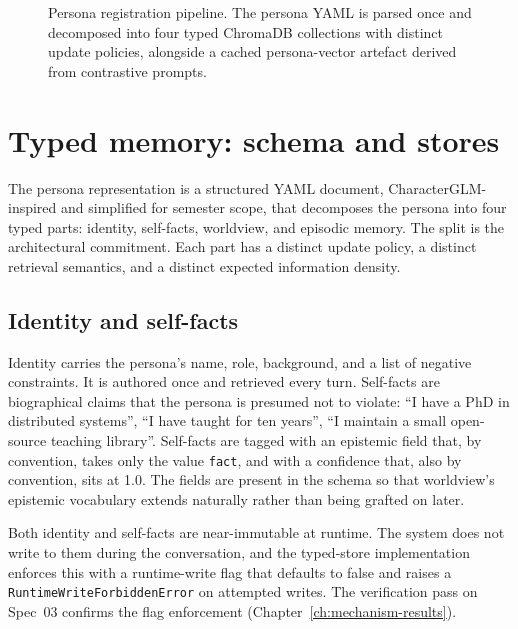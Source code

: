 \begin{figure}[H]
  \caption{Persona registration pipeline. The persona YAML is parsed once and decomposed into four typed ChromaDB collections with distinct update policies, alongside a cached persona-vector artefact derived from contrastive prompts.}
  \label{fig:registration-pipeline}
\end{figure}

\section{Typed memory: schema and stores}

The persona representation is a structured YAML document, CharacterGLM-inspired\autocite{characterglm2023} and simplified for semester scope, that decomposes the persona into four typed parts: identity, self-facts, worldview, and episodic memory. The split is the architectural commitment. Each part has a distinct update policy, a distinct retrieval semantics, and a distinct expected information density.

\subsection{Identity and self-facts}

Identity carries the persona's name, role, background, and a list of negative constraints. It is authored once and retrieved every turn. Self-facts are biographical claims that the persona is presumed not to violate: ``I have a PhD in distributed systems'', ``I have taught for ten years'', ``I maintain a small open-source teaching library''. Self-facts are tagged with an epistemic field that, by convention, takes only the value \texttt{fact}, and with a confidence that, also by convention, sits at 1.0. The fields are present in the schema so that worldview's epistemic vocabulary extends naturally rather than being grafted on later.

Both identity and self-facts are near-immutable at runtime. The system does not write to them during the conversation, and the typed-store implementation enforces this with a runtime-write flag that defaults to false and raises a \texttt{RuntimeWriteForbiddenError} on attempted writes. The verification pass on Spec~03 confirms the flag enforcement (Chapter~\ref{ch:mechanism-results}).

